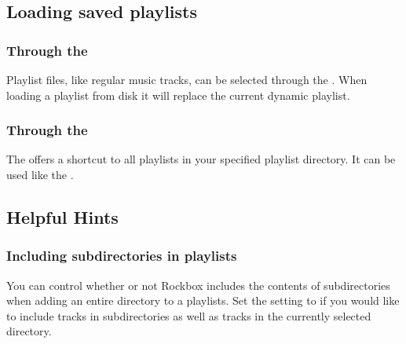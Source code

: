 \subsection{Loading saved playlists}
\subsubsection{Through the }
Playlist files, like regular music tracks, can be selected through the 
. When loading a playlist from disk it will replace
the current dynamic playlist.

\subsubsection{Through the }
The  offers a shortcut to all playlists in your
\daps{} specified playlist directory.
It can be used like the .

\subsection{Helpful Hints}

\subsubsection{Including subdirectories in playlists}
You can control whether or not Rockbox includes the contents of
subdirectories when adding an entire directory to a playlists.
Set the  setting to  if you
would like to include tracks in subdirectories as well as tracks in the
currently selected directory.
